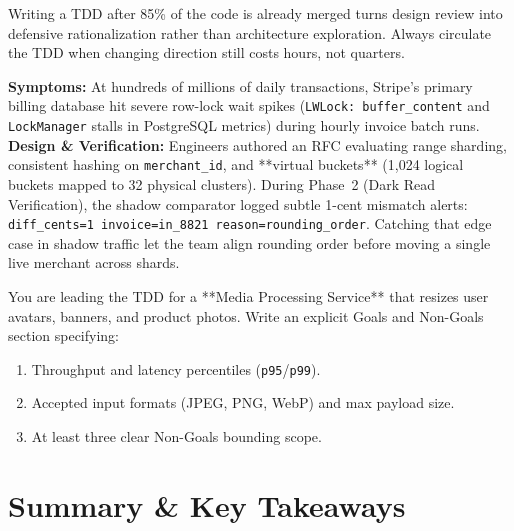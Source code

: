 \begin{commonmistakebox}
Writing a TDD after 85\% of the code is already merged turns design review into defensive rationalization rather than architecture exploration. Always circulate the TDD when changing direction still costs hours, not quarters.
\end{commonmistakebox}

\begin{realworldbox}
\textbf{Symptoms:} At hundreds of millions of daily transactions, Stripe's primary billing database hit severe row-lock wait spikes (\texttt{LWLock: buffer\_content} and \texttt{LockManager} stalls in PostgreSQL metrics) during hourly invoice batch runs.\\
\textbf{Design \& Verification:} Engineers authored an RFC evaluating range sharding, consistent hashing on \texttt{merchant\_id}, and **virtual buckets** (1,024 logical buckets mapped to 32 physical clusters). During Phase~2 (Dark Read Verification), the shadow comparator logged subtle 1-cent mismatch alerts: \texttt{diff\_cents=1 invoice=in\_8821 reason=rounding\_order}. Catching that edge case in shadow traffic let the team align rounding order before moving a single live merchant across shards.
\end{realworldbox}

\begin{tryityourselfbox}
You are leading the TDD for a **Media Processing Service** that resizes user avatars, banners, and product photos. Write an explicit Goals and Non-Goals section specifying:
\begin{enumerate}
  \item Throughput and latency percentiles (\texttt{p95}/\texttt{p99}).
  \item Accepted input formats (JPEG, PNG, WebP) and max payload size.
  \item At least three clear Non-Goals bounding scope.
\end{enumerate}
\end{tryityourselfbox}

\section{Summary \protect\& Key Takeaways}

